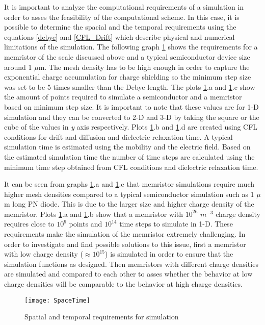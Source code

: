 \begin{doublespace}
It is important to analyze the computational requirements of a simulation in order to asses the feasibility of the computational scheme. In this case, it is possible to determine the spacial and the temporal requirements using the equations \ref{debye} and \ref{CFL_Drift} which describe physical and numerical limitations of the simulation. The following graph \ref{SpaceTime} shows the requirements for a memristor of the scale discussed above and a typical semiconductor device size around 1 $\mu$m. The mesh density has to be high enough in order to capture the exponential charge accumulation for charge shielding so the minimum step size was set to be 5 times smaller than the Debye length. The plots \ref{SpaceTime}.a and \ref{SpaceTime}.c show the amount of points required to simulate a semiconductor and a memristor based on minimum step size. It is important to note that these values are for 1-D simulation and they can be converted to 2-D and 3-D by taking the square or the cube of the values in \textit{y} axis respectively. Plots \ref{SpaceTime}.b and \ref{SpaceTime}.d are created using CFL conditions for drift and diffusion and dielectric relaxation time. A typical simulation time is estimated using the mobility and the electric field. Based on the estimated simulation time the number of time steps are calculated using the minimum time step obtained from CFL conditions and dielectric relaxation time.

It can be seen from graphs \ref{SpaceTime}.a and \ref{SpaceTime}.c that memristor simulations require much higher mesh densities compared to a typical semiconductor simulation such as 1 $\mu$m long PN diode. This is due to the larger size and higher charge density of the memristor. Plots \ref{SpaceTime}.a and \ref{SpaceTime}.b show that a memristor with $10^{26}$ $m^{-3}$ charge density requires close to $10^9$ points and $10^{14}$ time steps to simulate in 1-D. These requirements make the simulation of the memristor extremely challenging. In order to investigate and find possible solutions to this issue, first a memristor with low charge density ($\approx 10^{15}$) is simulated in order to ensure that the simulation functions as designed. Then memristors with different charge densities are simulated and compared to each other to asses whether the behavior at low charge densities will be comparable to the behavior at high charge densities.

\begin{landscape}
\begin{figure}[htp]
\centering
\texttt{[image: SpaceTime]}
\caption{Spatial and temporal requirements for simulation} 
\label{SpaceTime}
\end{figure}
\end{landscape}

\end{doublespace}

